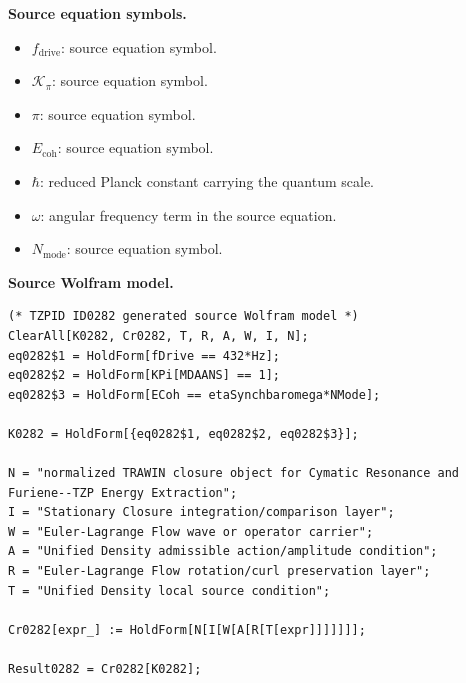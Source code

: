 \begin{minipage}[t]{0.49\linewidth}
\begingroup
\small
\raggedright
\textbf{Source equation symbols.}\par
\begin{itemize}[leftmargin=1.35em,itemsep=1pt,topsep=1pt,parsep=0pt]
    \item $f_{\mathrm{drive}}$: source equation symbol.
    \item $\mathcal{K}_{\pi}$: source equation symbol.
    \item $\pi$: source equation symbol.
    \item $E_{\mathrm{coh}}$: source equation symbol.
    \item $\hbar$: reduced Planck constant carrying the quantum scale.
    \item $\omega$: angular frequency term in the source equation.
    \item $N_{\mathrm{mode}}$: source equation symbol.
\end{itemize}
\endgroup
\end{minipage}\hfill
\begin{minipage}[t]{0.47\linewidth}
\begingroup
\scriptsize
\raggedright
\textbf{Source Wolfram model.}\par
\begin{Verbatim}[fontsize=\tiny,breaklines=true,breakanywhere=true]
(* TZPID ID0282 generated source Wolfram model *)
ClearAll[K0282, Cr0282, T, R, A, W, I, N];
eq0282$1 = HoldForm[fDrive == 432*Hz];
eq0282$2 = HoldForm[KPi[MDAANS] == 1];
eq0282$3 = HoldForm[ECoh == etaSynchbaromega*NMode];

K0282 = HoldForm[{eq0282$1, eq0282$2, eq0282$3}];

N = "normalized TRAWIN closure object for Cymatic Resonance and Furiene--TZP Energy Extraction";
I = "Stationary Closure integration/comparison layer";
W = "Euler-Lagrange Flow wave or operator carrier";
A = "Unified Density admissible action/amplitude condition";
R = "Euler-Lagrange Flow rotation/curl preservation layer";
T = "Unified Density local source condition";

Cr0282[expr_] := HoldForm[N[I[W[A[R[T[expr]]]]]]];

Result0282 = Cr0282[K0282];
\end{Verbatim}
\endgroup
\end{minipage}

